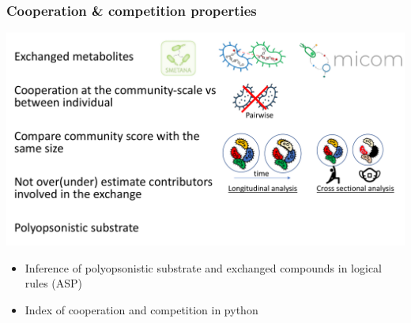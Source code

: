 \documentclass[8pt]{beamer}
\begin{document}
\begin{frame}
\frametitle{Cooperation \& competition properties}
\includegraphics[width=\textwidth]{figures/coop-properties.pdf}
\begin{block}{}
\begin{itemize}
\item Inference of polyopsonistic substrate and exchanged compounds in logical rules (ASP)
\item Index of cooperation and competition in python
\end{itemize}
\end{block}
\end{frame}
\end{document}
